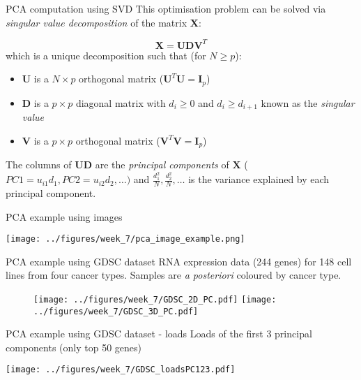 \documentclass[notes]{beamer}          %
\begin{document}
\begin{frame}{PCA computation using SVD}
This optimisation problem can be solved via \textit{singular value decomposition} of the matrix $\mathbf X$:

\begin{equation*}
\mathbf X = \mathbf{UDV}^T
\end{equation*}
which is a unique decomposition such that (for $N \ge p$):

\begin{itemize}
\item $\mathbf{U}$ is a $N \times p$ orthogonal matrix ($\mathbf{U}^T\mathbf{U}=\mathbf{I}_p$)
\item $\mathbf{D}$ is a $p \times p$ diagonal matrix with $d_i \ge 0$ and $d_{i} \ge d_{i+1}$ known as the \textit{singular value}
\item $\mathbf{V}$ is a $p \times p$ orthogonal matrix ($\mathbf{V}^T\mathbf{V}=\mathbf{I}_p$)

\end{itemize}

The columns of $\mathbf{UD}$ are the \textit{principal components} of $\mathbf{X}$ ($PC1=u_{i1}d_1, PC2=u_{i2}d_2, \dots)$ and $\frac{d_{1}^2}{N}, \frac{d_{2}^2}{N}, \dots$ is the variance explained by each principal component.
\end{frame}

\begin{frame}{PCA example using images}
\begin{center}
\texttt{[image: ../figures/week\_7/pca\_image\_example.png]}  
\end{center}
\end{frame}


\begin{frame}{PCA example using GDSC dataset}
RNA expression data (244 genes) for 148 cell lines from four cancer types. Samples are \textit{a posteriori}  coloured by cancer type.
\begin{figure}
  \texttt{[image: ../figures/week\_7/GDSC\_2D\_PC.pdf]}  
\endminipage\hfill
{}
  \texttt{[image: ../figures/week\_7/GDSC\_3D\_PC.pdf]}  
\endminipage\hfill
\end{figure}
\end{frame}

\begin{frame}{PCA example using GDSC dataset - loads}
Loads of the first 3 principal components (only top 50 genes)
\begin{center}
\texttt{[image: ../figures/week\_7/GDSC\_loadsPC123.pdf]}  
\end{center}
\end{frame}
\end{document}
